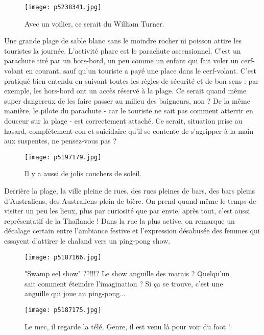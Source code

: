 \documentclass{book}
\begin{document}
\begin{figure}[h]
\centering
\texttt{[image: p5238341.jpg]}
\caption*{Avec un voilier, ce serait du William Turner.}
\end{figure}

Une grande plage de sable blanc sans le moindre rocher ni poisson attire les touristes la journée. L'activité phare est le parachute ascensionnel. C'est un parachute tiré par un hors-bord, un peu comme un enfant qui fait voler un cerf-volant en courant, sauf qu'un touriste a payé une place dans le cerf-volant. C'est pratiqué bien entendu en suivant toutes les règles de sécurité et de bon sens : par exemple, les hors-bord ont un accès réservé à la plage. Ce serait quand même super dangereux de les faire passer au milieu des baigneurs, non ? De la même manière, le pilote du parachute - car le touriste ne sait pas comment atterrir en douceur sur la plage - est correctement attaché. Ce serait, situation prise au hasard, complètement con et suicidaire qu'il se contente de s'agripper à la main aux suspentes, ne pensez-vous pas ?


\begin{figure}[h]
\centering
\texttt{[image: p5197179.jpg]}
\caption*{Il y a aussi de jolis couchers de soleil.}
\end{figure}

Derrière la plage, la ville pleine de rues, des rues pleines de bars, des bars pleins d'Australiens, des Australiens plein de bière. On prend quand même le temps de visiter un peu les lieux, plus par curiosité que par envie, après tout, c'est aussi représentatif de la Thaïlande ! Dans la rue la plus active, on remarque un décalage certain entre l'ambiance festive et l'expression désabusée des femmes qui essayent d'attirer le chaland vers un ping-pong show.


\begin{figure}[h]
\centering
\texttt{[image: p5187166.jpg]}
\caption*{"Swamp eel show" ??!!!? Le show anguille des marais ? Quelqu'un sait comment éteindre l'imagination ? Si ça se trouve, c'est une anguille qui joue au ping-pong...}
\end{figure}


\begin{figure}[h]
\centering
\texttt{[image: p5187175.jpg]}
\caption*{Le mec, il regarde la télé. Genre, il est venu là pour voir du foot !}
\end{figure}
\end{document}

